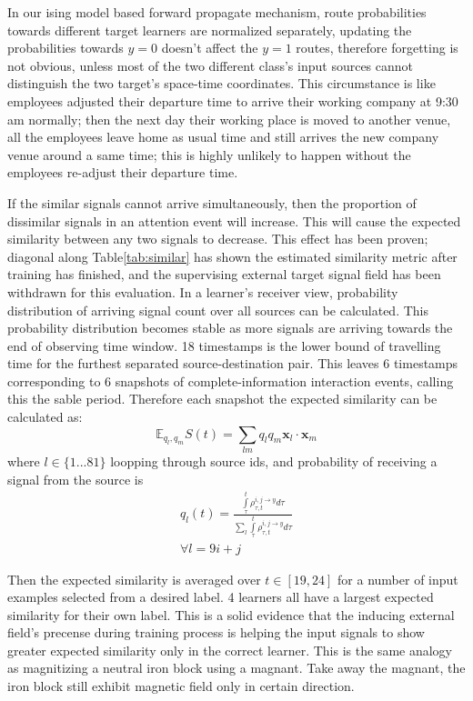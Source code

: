 \documentclass[11pt,a4paper]{article}
\begin{document}
\begin{multicols}{2}
  In our ising model based forward propagate mechanism, route probabilities towards different target learners are normalized separately, 
  updating the probabilities towards $y=0$ doesn't affect the $y=1$ routes, therefore forgetting is not obvious, unless most of the two different class's input sources cannot distinguish the two target's space-time coordinates. 
  This circumstance is like employees adjusted their departure time to arrive their working company at 9:30 am normally; 
  then the next day their working place is moved to another venue,  
  all the employees leave home as usual time and still arrives the new company venue around a same time; this is highly unlikely to happen without the employees re-adjust their departure time. 

  If the similar signals cannot arrive simultaneously, then the proportion of dissimilar signals in an attention event will increase. 
  This will cause the expected similarity between any two signals to decrease. This effect has been proven; diagonal along Table\ref{tab:similar} 
  has shown the estimated similarity metric after training has finished, and the supervising external target signal field has been withdrawn for this evaluation. 
  In a learner's receiver view, probability distribution of arriving signal count over all sources can be calculated. This probability distribution becomes stable as more signals 
  are arriving towards the end of observing time window. 18 timestamps is the lower bound of travelling time for the furthest separated source-destination pair. 
  This leaves 6 timestamps corresponding to 6 snapshots of complete-information interaction events, calling this the sable period. 
  Therefore each snapshot the expected similarity can be calculated as:
  $$
  \mathbb{E}_{q_l, q_m} S(t) = \sum\limits_{lm} q_l q_m \boldsymbol{x}_l \cdot \boldsymbol{x}_m
  $$
  where $l \in \{1...81\}$ loopping through source ids, and probability of receiving a signal from the source is
  \begin{equation}
  \begin{split}
  q_{l}(t) = \frac {\int\limits_{\tau}^t\rho_{\tau,t}^{i,j\rightarrow y} d\tau} {\sum\limits_{l} \int\limits_{\tau}^t \rho_{\tau,t}^{i,j\rightarrow y} d\tau} \\ 
  \forall l=9i+j
  \end{split}
  \end{equation}

  Then the expected similarity is averaged over $t \in [19,24]$ for a number of input examples selected from a desired label. 
  4 learners all have a largest expected similarity for their own label. This is a solid evidence that the inducing external field's precense 
  during training process is helping the input signals to show greater expected similarity only in the correct learner. 
  This is the same analogy as magnitizing a neutral iron block using a magnant. Take away the magnant, the iron block still exhibit magnetic field only in certain direction.


\end{multicols}
\end{document}
